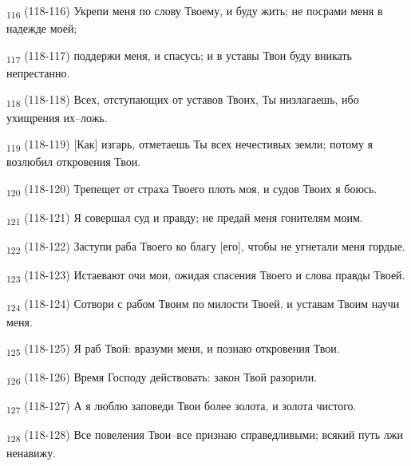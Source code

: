 \begin{tcolorbox}
\textsubscript{116} (118-116) Укрепи меня по слову Твоему, и буду жить; не посрами меня в надежде моей;
\end{tcolorbox}
\begin{tcolorbox}
\textsubscript{117} (118-117) поддержи меня, и спасусь; и в уставы Твои буду вникать непрестанно.
\end{tcolorbox}
\begin{tcolorbox}
\textsubscript{118} (118-118) Всех, отступающих от уставов Твоих, Ты низлагаешь, ибо ухищрения их--ложь.
\end{tcolorbox}
\begin{tcolorbox}
\textsubscript{119} (118-119) [Как] изгарь, отметаешь Ты всех нечестивых земли; потому я возлюбил откровения Твои.
\end{tcolorbox}
\begin{tcolorbox}
\textsubscript{120} (118-120) Трепещет от страха Твоего плоть моя, и судов Твоих я боюсь.
\end{tcolorbox}
\begin{tcolorbox}
\textsubscript{121} (118-121) Я совершал суд и правду; не предай меня гонителям моим.
\end{tcolorbox}
\begin{tcolorbox}
\textsubscript{122} (118-122) Заступи раба Твоего ко благу [его], чтобы не угнетали меня гордые.
\end{tcolorbox}
\begin{tcolorbox}
\textsubscript{123} (118-123) Истаевают очи мои, ожидая спасения Твоего и слова правды Твоей.
\end{tcolorbox}
\begin{tcolorbox}
\textsubscript{124} (118-124) Сотвори с рабом Твоим по милости Твоей, и уставам Твоим научи меня.
\end{tcolorbox}
\begin{tcolorbox}
\textsubscript{125} (118-125) Я раб Твой: вразуми меня, и познаю откровения Твои.
\end{tcolorbox}
\begin{tcolorbox}
\textsubscript{126} (118-126) Время Господу действовать: закон Твой разорили.
\end{tcolorbox}
\begin{tcolorbox}
\textsubscript{127} (118-127) А я люблю заповеди Твои более золота, и золота чистого.
\end{tcolorbox}
\begin{tcolorbox}
\textsubscript{128} (118-128) Все повеления Твои--все признаю справедливыми; всякий путь лжи ненавижу.
\end{tcolorbox}
